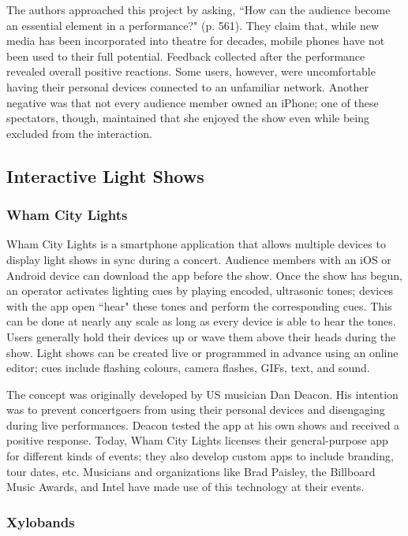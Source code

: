 The authors approached this project by asking, ``How can the audience become an essential element in a performance?" (p. 561). They claim that, while new media has been incorporated into theatre for decades, mobile phones have not been used to their full potential. Feedback collected after the performance revealed overall positive reactions. Some users, however, were uncomfortable having their personal devices connected to an unfamiliar network. Another negative was that not every audience member owned an iPhone; one of these spectators, though, maintained that she enjoyed the show even while being excluded from the interaction.

\subsection{Interactive Light Shows}

\subsubsection{Wham City Lights}

Wham City Lights is a smartphone application that allows multiple devices to display light shows in sync during a concert. Audience members with an iOS or Android device can download the app before the show. Once the show has begun, an operator activates lighting cues by playing encoded, ultrasonic tones; devices with the app open ``hear" these tones and perform the corresponding cues. This can be done at nearly any scale as long as every device is able to hear the tones. Users generally hold their devices up or wave them above their heads during the show. Light shows can be created live or programmed in advance using an online editor; cues include flashing colours, camera flashes, GIFs, text, and sound.

The concept was originally developed by US musician Dan Deacon. His intention was to prevent concertgoers from using their personal devices and disengaging during live performances. Deacon tested the app at his own shows and received a positive response. Today, Wham City Lights licenses their general-purpose app for different kinds of events; they also develop custom apps to include branding, tour dates, etc. Musicians and organizations like Brad Paisley, the Billboard Music Awards, and Intel have made use of this technology at their events.

\subsubsection{Xylobands}

